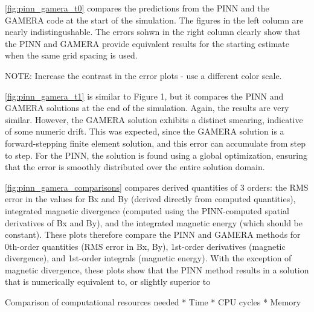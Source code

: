\documentclass[]{article}
\begin{document}
\ref{fig:pinn_gamera_t0} compares the predictions from the PINN and the GAMERA code at the start of the simulation. The figures in the left column are nearly
indistingushable. The errors sohwn in the right column clearly show
that the PINN and GAMERA provide equivalent results for the starting
estimate when the same grid spacing is used.

NOTE: Increase the contrast in the error plots - use a different color
scale.

\ref{fig:pinn_gamera_t1} is similar to Figure 1, but it compares the PINN and GAMERA
solutions at the end of the simulation. Again, the results are very
similar. However, the GAMERA solution exhibits a distinct smearing,
indicative of some numeric drift. This was expected, since the GAMERA
solution is a forward-stepping finite element solution, and this error
can accumulate from step to step. For the PINN, the solution is found
using a global optimization, ensuring that the error is smoothly
distributed over the entire solution domain.

\ref{fig:pinn_gamera_comparisons} compares derived quantities of 3 orders: the RMS error in the
values for Bx and By (derived directly from computed quantities),
integrated magnetic divergence (computed using the PINN-computed
spatial derivatives of Bx and By), and the integrated magnetic energy
(which should be constant). These plots therefore compare the PINN and
GAMERA methods for 0th-order quantities (RMS error in Bx, By),
1st-order derivatives (magnetic divergence), and 1st-order integrals
(magnetic energy). With the exception of magnetic divergence, these
plots show that the PINN method results in a solution that is
numerically equivalent to, or slightly superior to

Comparison of computational resources needed
* Time
* CPU cycles
* Memory


%

\end{document}

